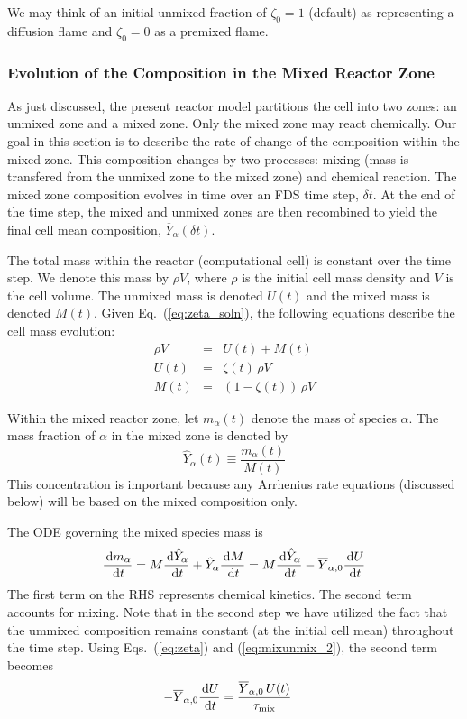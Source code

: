 We may think of an initial unmixed fraction of $\zeta_0=1$ (default) as representing a diffusion flame and $\zeta_0=0$ as a premixed flame.


\subsubsection{Evolution of the Composition in the Mixed Reactor Zone}

As just discussed, the present reactor model partitions the cell into two zones: an unmixed zone and a mixed zone.  Only the mixed zone may react chemically.  Our goal in this section is to describe the rate of change of the composition within the mixed zone.  This composition changes by two processes: mixing (mass is transfered from the unmixed zone to the mixed zone) and chemical reaction.  The mixed zone composition evolves in time over an FDS time step, $\delta t$.  At the end of the time step, the mixed and unmixed zones are then recombined to yield the final cell mean composition, $\overline{Y}_\alpha(\delta t)$.

The total mass within the reactor (computational cell) is constant over the time step.  We denote this mass by $\rho V$, where $\rho$ is the initial cell mass density and $V$ is the cell volume.  The unmixed mass is denoted $U(t)$ and the mixed mass is denoted $M(t)$.  Given Eq.~(\ref{eq:zeta_soln}), the following equations describe the cell mass evolution:
\begin{eqnarray}
\label{eq:mixunmix_1} \rho V &=& U(t) + M(t) \\
\label{eq:mixunmix_2} U(t) &=& \zeta(t)\,\rho V \\
\label{eq:mixunmix_3} M(t) &=& (1-\zeta(t))\,\rho V
\end{eqnarray}

Within the mixed reactor zone, let $m_\alpha(t)$ denote the mass of species $\alpha$.  The mass fraction of $\alpha$ in the mixed zone is denoted by
\begin{equation}\label{eq:mass_fraction_mixed}
\hat{Y}_{\alpha}(t)\equiv\frac{m_{\alpha}(t)}{M(t)}
\end{equation}
This concentration is important because any Arrhenius rate equations (discussed below) will be based on the mixed composition only.

The ODE governing the mixed species mass is
\begin{equation}\label{eq:mixmass}
\frac{\,\mathrm{d} m_{\alpha}}{\,\mathrm{d} t} = M \frac{\,\mathrm{d} \hat{Y}_\alpha}{\,\mathrm{d} t} + \hat{Y}_\alpha \frac{\,\mathrm{d} M}{\,\mathrm{d} t} = M \frac{\,\mathrm{d} \hat{Y}_\alpha}{\,\mathrm{d} t} - \overline{Y}_{\alpha,0} \frac{\,\mathrm{d} U}{\,\mathrm{d} t}
\end{equation}
The first term on the RHS represents chemical kinetics.  The second term accounts for mixing.  Note that in the second step we have utilized the fact that the ummixed composition remains constant (at the initial cell mean) throughout the time step. Using Eqs.~(\ref{eq:zeta}) and (\ref{eq:mixunmix_2}), the second term becomes
\begin{align}
\label{eq:mixingstep}
-\overline{Y}_{\alpha,0} \frac{\,\mathrm{d} U}{\,\mathrm{d} t} &= \frac{\overline{Y}_{\alpha,0} \, U(t) }{\tau_{\rm mix}}
\end{align}

